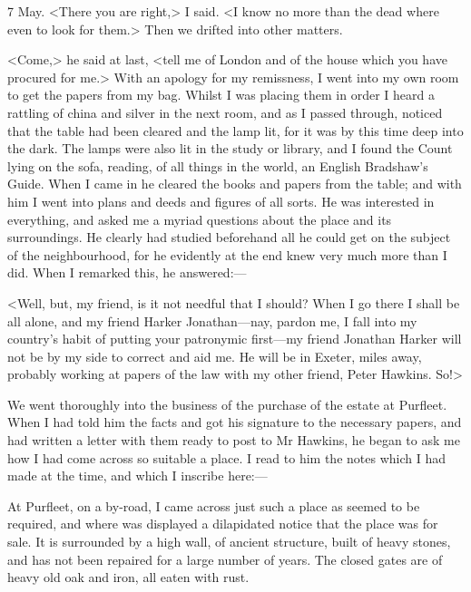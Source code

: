 \begin{diary}{7 May.}
<There you are right,> I said. <I know no more than the dead where even to look for them.> Then we drifted into other matters.

<Come,> he said at last, <tell me of London and of the house which you have procured for me.> With an apology for my remissness, I went into my own room to get the papers from my bag. Whilst I was placing them in order I heard a rattling of china and silver in the next room, and as I passed through, noticed that the table had been cleared and the lamp lit, for it was by this time deep into the dark. The lamps were also lit in the study or library, and I found the Count lying on the sofa, reading, of all things in the world, an English Bradshaw's Guide. When I came in he cleared the books and papers from the table; and with him I went into plans and deeds and figures of all sorts. He was interested in everything, and asked me a myriad questions about the place and its surroundings. He clearly had studied beforehand all he could get on the subject of the neighbourhood, for he evidently at the end knew very much more than I did. When I remarked this, he answered:—

<Well, but, my friend, is it not needful that I should? When I go there I shall be all alone, and my friend Harker Jonathan—nay, pardon me, I fall into my country's habit of putting your patronymic first—my friend Jonathan Harker will not be by my side to correct and aid me. He will be in Exeter, miles away, probably working at papers of the law with my other friend, Peter Hawkins. So!>

We went thoroughly into the business of the purchase of the estate at Purfleet. When I had told him the facts and got his signature to the necessary papers, and had written a letter with them ready to post to Mr Hawkins, he began to ask me how I had come across so suitable a place. I read to him the notes which I had made at the time, and which I inscribe here:—


At Purfleet, on a by-road, I came across just such a place as seemed to be required, and where was displayed a dilapidated notice that the place was for sale. It is surrounded by a high wall, of ancient structure, built of heavy stones, and has not been repaired for a large number of years. The closed gates are of heavy old oak and iron, all eaten with rust.


\end{diary}
